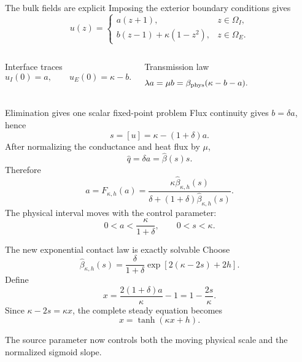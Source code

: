 \documentclass[aspectratio=169,11pt]{beamer}
\newcommand{\betahat}{\widehat{\beta}}
\begin{document}
\begin{frame}{The bulk fields are explicit}
  Imposing the exterior boundary conditions gives
  \[
    u(z)=
    \begin{cases}
      a(z+1), & z\in\Omega_I,\\[0.2em]
      b(z-1)+\kappa(1-z^2), & z\in\Omega_E.
    \end{cases}
  \]

  \begin{columns}[T,onlytextwidth]
      \begin{block}{Interface traces}
        \[
          u_I(0)=a,\qquad u_E(0)=\kappa-b.
        \]
      \end{block}
      \begin{block}{Transmission law}
        \[
          \lambda a=\mu b
          =\beta_{\rm phys}(\kappa-b-a).
        \]
      \end{block}
  \end{columns}
\end{frame}

\begin{frame}{Elimination gives one scalar fixed-point problem}
  Flux continuity gives \(b=\delta a\), hence
  \[
    \boxed{s=[u]=\kappa-(1+\delta)a.}
  \]
  After normalizing the conductance and heat flux by \(\mu\),
  \[
    \widehat q=\delta a=\betahat(s)s.
  \]
  Therefore
  \begin{equation*}
    \boxed{
    a=F_{\kappa,h}(a)
    =\frac{\kappa\betahat_{\kappa,h}(s)}
    {\delta+(1+\delta)\betahat_{\kappa,h}(s)}.}
  \end{equation*}
  The physical interval moves with the control parameter:
  \[
    0<a<\frac{\kappa}{1+\delta},\qquad 0<s<\kappa.
  \]
\end{frame}

\begin{frame}{The new exponential contact law is exactly solvable}
  Choose
  \[
    \boxed{
    \betahat_{\kappa,h}(s)
    =\frac{\delta}{1+\delta}
    \exp\!\left[2(\kappa-2s)+2h\right].}
  \]
  Define
  \[
    x=\frac{2(1+\delta)a}{\kappa}-1
     =1-\frac{2s}{\kappa}.
  \]
  Since \(\kappa-2s=\kappa x\), the complete steady equation becomes
  \[
    \boxed{x=\tanh(\kappa x+h).}
  \]

  \begin{center}
    \small The source parameter now controls both the moving physical scale and the normalized sigmoid slope.
  \end{center}
\end{frame}
\end{document}
